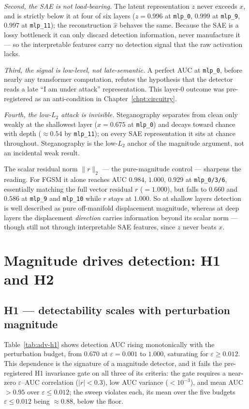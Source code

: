 \documentclass[../ppgc-tese.tex]{subfiles}
\begin{document}
\emph{Second, the SAE is not load-bearing.} The latent representation $z$ never
exceeds $x$, and is strictly below it at four of six layers ($z{=}0.996$ at
\texttt{mlp\_0}, $0.999$ at \texttt{mlp\_9}, $0.997$ at \texttt{mlp\_11}); the
reconstruction $\hat{x}$ behaves the same. Because the SAE is a lossy bottleneck it
can only discard detection information, never manufacture it --- so the interpretable
features carry no detection signal that the raw activation lacks.

\emph{Third, the signal is low-level, not late-semantic.} A perfect AUC at
\texttt{mlp\_0}, before nearly any transformer computation, refutes the hypothesis
that the detector reads a late ``I am under attack'' representation. This layer-0
outcome was pre-registered as an anti-condition in Chapter~\ref{chpt:circuitry}.

\emph{Fourth, the low-$L_2$ attack is invisible.} Steganography separates from clean
only weakly at the shallowest layer ($x{=}0.675$ at \texttt{mlp\_0}) and decays
toward chance with depth ($\approx0.54$ by \texttt{mlp\_11}); on every SAE
representation it sits at chance throughout. Steganography is the low-$L_2$ anchor of
the magnitude argument, not an incidental weak result.

The scalar residual norm $\lVert r\rVert_2$ --- the pure-magnitude control ---
sharpens the reading. For FGSM it alone reaches AUC $0.984$, $1.000$, $0.929$ at
\texttt{mlp\_0/3/6}, essentially matching the full vector residual $r$ ($=1.000$),
but falls to $0.660$ and $0.586$ at \texttt{mlp\_9} and \texttt{mlp\_10} while $r$
stays at $1.000$. So at shallow layers detection is well described as pure
off-manifold displacement magnitude, whereas at deep layers the displacement
\emph{direction} carries information beyond its scalar norm --- though still not
through interpretable SAE features, since $z$ never beats $x$.

\section{Magnitude drives detection: H1 and H2}
\label{sec:adv-h1h2}

\subsection{H1 --- detectability scales with perturbation magnitude}
Table~\ref{tab:adv-h1} shows detection AUC rising monotonically with the
perturbation budget, from $0.670$ at $\varepsilon{=}0.001$ to $1.000$, saturating
for $\varepsilon\geq0.012$. This dependence is the signature of a magnitude detector,
and it fails the pre-registered H1 invariance gate on all three of its criteria: the
gate requires a near-zero $\varepsilon$--AUC correlation ($|r|<0.3$), low AUC
variance ($<10^{-3}$), and mean AUC $>0.95$ over $\varepsilon\leq0.012$; the sweep
violates each, its mean over the five budgets $\varepsilon\leq0.012$ being
$\approx0.88$, below the floor.
\end{document}
